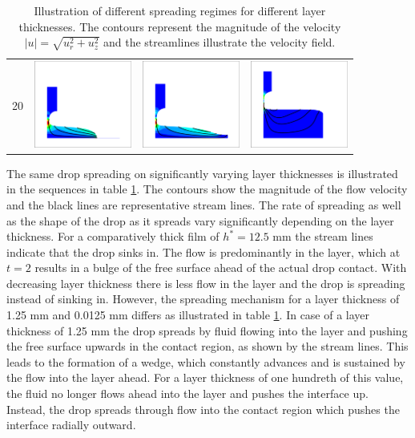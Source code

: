 \documentclass[aip,graphicx]{revtex4-1}
\begin{document}
\begin{table}[!ht]
\begin{tabular}{l | >{\centering\arraybackslash}m{3.5cm} | >{\centering\arraybackslash}m{3.5cm} | >{\centering\arraybackslash}m{3.5cm}}
  20 & \includegraphics[trim={45px 35px 35px 35px},clip,width=3.2cm]{figures/glucose_layer_0_0125mm_893_t_20.eps} & 
  \includegraphics[trim={45px 35px 35px 35px},clip,width=3.2cm]{figures/glucose_layer_1_25mm_281_t_20.eps} & 
  \includegraphics[trim={45px 35px 35px 35px},clip,width=3.2cm]{figures/glucose_layer_12_5mm_285_t_20.eps} \\
 \end{tabular}
 \caption{Illustration of different spreading regimes for different layer thicknesses. The contours represent the magnitude of the velocity $|u|=\sqrt{u_r^2+u_z^2}$ and the streamlines illustrate the velocity field.}
 \label{tab:spreading_regimes}
\end{table}

The same drop spreading on significantly varying layer thicknesses is illustrated in the sequences in table \ref{tab:spreading_regimes}.
The contours show the magnitude of the flow velocity and the black lines are representative stream lines.
The rate of spreading as well as the shape of the drop as it spreads vary significantly depending on the layer thickness.
For a comparatively thick film of $h^*=12.5$ mm the stream lines indicate that the drop sinks in. 
The flow is predominantly in the layer, which at $t=2$ results in a bulge of the free surface ahead of the actual drop contact.
With decreasing layer thickness there is less flow in the layer and the drop is spreading instead of sinking in.
However, the spreading mechanism for a layer thickness of 1.25 mm and 0.0125 mm differs as illustrated in table \ref{tab:spreading_regimes}.
In case of a layer thickness of 1.25 mm the drop spreads by fluid flowing into the layer and pushing the free surface upwards in the contact region, as shown by the stream lines.
This leads to the formation of a wedge, which constantly advances and is sustained by the flow into the layer ahead.
For a layer thickness of one hundreth of this value, the fluid no longer flows ahead into the layer and pushes the interface up.
Instead, the drop spreads through flow into the contact region which pushes the interface radially outward. \\
\end{document}
